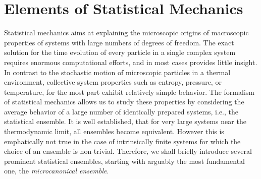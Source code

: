 \documentclass[12pt]{report}
\begin{document}
\chapter{Elements of Statistical Mechanics}
\label{chap:elements_of_stat_mech}
Statistical mechanics aims at explaining the microscopic origins of macroscopic properties of systems with large numbers of degrees of freedom. The exact solution for the time evolution of every particle in a single complex system requires enormous computational efforts, and in most cases provides little insight. In contrast to the stochastic motion of microscopic particles in a thermal environment, collective system properties such as entropy, pressure, or temperature, for the most part exhibit relatively simple behavior. The formalism of statistical mechanics allows us to study these properties by considering the average behavior of a large number of identically prepared systems, i.e., the statistical ensemble. It is well established, that for very large systems near the thermodynamic limit, all ensembles become equivalent. However this is emphatically not true in the case of intrinsically finite systems for which the choice of an ensemble is non-trivial\cite{Bachmann2014}. Therefore, we shall briefly introduce several prominent statistical ensembles, starting with arguably the most fundamental one, the \textit{microcanonical ensemble}.


\end{document}
